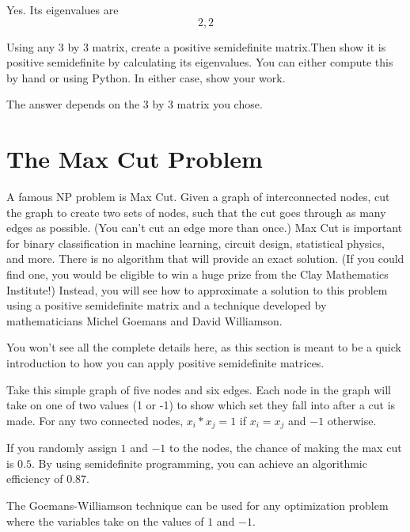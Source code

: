 \begin{Answer}[ref=pos-matrix-01]
Yes. Its eigenvalues are $$2,2$$
\end{Answer}
  
\begin{Exercise}[title={Creating a positive semidefinite matrix}, label=pos-matrix-02]
Using any 3 by 3 matrix, create a positive semidefinite matrix.Then show it is positive semidefinite by calculating its eigenvalues.  You can either compute this by hand or using Python.  In either case, show your work.
\end{Exercise}

\begin{Answer}[ref=pos-matrix-02]
The answer depends on the 3 by 3 matrix you chose.
\end{Answer}

\section{The Max Cut Problem}
A famous NP problem is Max Cut. Given a graph of interconnected nodes, cut the graph to create two sets of nodes, such that the cut goes through as many edges as possible. (You can't cut an edge more than once.) Max Cut is important for binary classification in machine learning, circuit design, statistical physics, and more. There is no algorithm that will provide an exact solution. (If you could find one, you would be eligible to win a huge prize from the Clay Mathematics Institute!) Instead, you will see how to approximate a solution to this  problem using a positive semidefinite matrix and a technique developed by mathematicians Michel Goemans and David Williamson. 

You won't see all the complete details here, as this section is meant to be a quick introduction to how you can apply positive semidefinite matrices. 

Take this simple graph of five nodes and six edges. Each node in the graph will take on one of two values (1 or -1) to show which set they fall into after a cut is made. For any two connected nodes, $x_i*x_j = 1$ if $x_i = x_j$ and $-1$ otherwise.

If you randomly assign $1$ and $-1$ to the nodes, the chance of making the max cut is $0.5$. By using semidefinite programming, you can achieve an algorithmic efficiency of $0.87$. 

The Goemans-Williamson technique can be used for any optimization problem where the variables take on the values of $1$ and $-1$.

